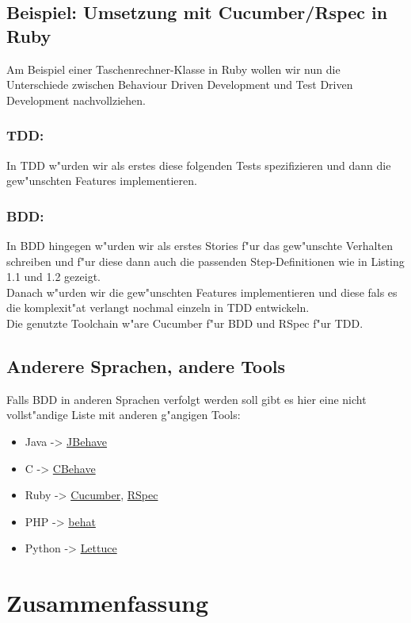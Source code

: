\documentclass[runningheads,a4paper]{llncs}
\begin{document}
  \subsection{Beispiel: Umsetzung mit Cucumber/Rspec in Ruby}
    Am Beispiel einer Taschenrechner-Klasse in Ruby wollen wir nun die 
    Unterschiede zwischen Behaviour Driven Development und Test Driven 
    Development nachvollziehen.
    \subsubsection{TDD:}
      In TDD w"urden wir als erstes diese folgenden Tests spezifizieren 
      und dann die gew"unschten Features implementieren.
      

    \subsubsection{BDD:}
      In BDD hingegen w"urden wir als erstes Stories f"ur das gew"unschte
      Verhalten schreiben und f"ur diese dann auch die passenden Step-Definitionen
      wie in Listing 1.1 und 1.2 gezeigt.\\
      Danach w"urden wir die gew"unschten Features implementieren und diese
      fals es die komplexit"at verlangt nochmal einzeln in TDD entwickeln.\\
      Die genutzte Toolchain w"are Cucumber f"ur BDD und RSpec f"ur TDD.

  \subsection{Anderere Sprachen, andere Tools}
    Falls BDD in anderen Sprachen verfolgt werden soll gibt es hier eine nicht
    vollst"andige Liste mit anderen g"angigen Tools:
    \begin{itemize}
      \item Java -> \href{http://http://jbehave.org/}{JBehave}
      \item C -> \href{http://code.google.com/p/cbehave/}{CBehave}
      \item Ruby -> \href{http://cukes.info}{Cucumber}, \href{http://rspec.info}{RSpec}
      \item PHP -> \href{http://behat.org}{behat}
      \item Python -> \href{http://lettuce.it}{Lettuce}
    \end{itemize}
\section{Zusammenfassung}
  




\end{document}
